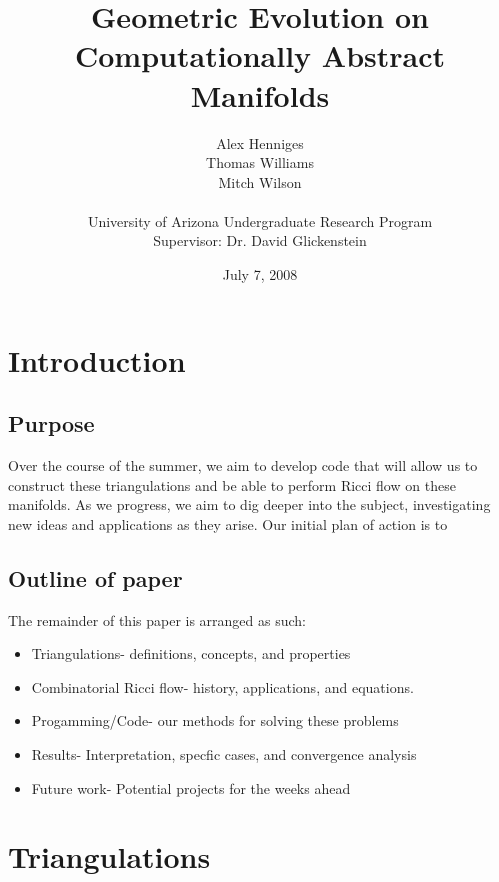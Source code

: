 \documentclass[12pt]{article}
\title{Geometric Evolution on Computationally Abstract Manifolds}
\author{Alex Henniges \\ Thomas Williams \\ Mitch Wilson \\ \\ University of Arizona Undergraduate Research Program\\
Supervisor: Dr. David Glickenstein\\
}
\date{July 7, 2008}
\begin{document}
\maketitle
	
\newpage
\section{Introduction}
\maketitle
\subsection{Purpose}
\maketitle

Over the course of the summer, we aim to develop code that will allow us to construct these triangulations and be able to perform Ricci flow on these manifolds. As we progress, we aim to dig deeper into the subject, investigating new ideas and applications as they arise. Our initial plan of action is to

\subsection{Outline of paper}
\maketitle

The remainder of this paper is arranged as such:
\begin{itemize}
\item Triangulations- definitions, concepts, and properties
\item Combinatorial Ricci flow- history, applications, and equations. 
\item Progamming/Code- our methods for solving these problems
\item Results- Interpretation, specfic cases, and convergence analysis
\item Future work- Potential projects for the weeks ahead
\end{itemize}

\section{Triangulations}
\maketitle
\end{document}
